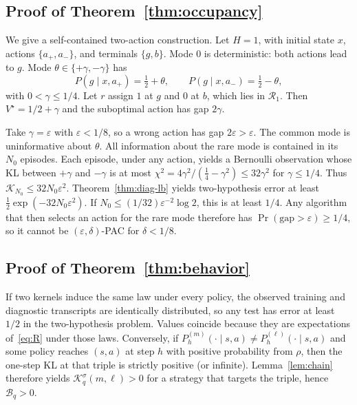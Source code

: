 \documentclass[11pt]{article}
\newcommand{\Rone}{\mathcal{R}_1}
\newcommand{\Prb}{\Pr}
\newcommand{\eps}{\varepsilon}
\begin{document}
\subsection{Proof of Theorem~\ref{thm:occupancy}}
We give a self-contained two-action construction. Let $H=1$, with initial
state $x$, actions $\{a_+,a_-\}$, and terminals $\{g,b\}$. Mode $0$ is
deterministic: both actions lead to $g$. Mode $\theta\in\{+\gamma,-\gamma\}$
has
\[
P(g\mid x,a_+)=\tfrac12+\theta,\qquad
P(g\mid x,a_-)=\tfrac12-\theta,
\]
with $0<\gamma\le 1/4$. Let $r$ assign $1$ at $g$ and $0$ at $b$, which lies
in $\Rone$. Then $V^\star=1/2+\gamma$ and the suboptimal action has gap
$2\gamma$.

Take $\gamma=\eps$ with $\eps<1/8$, so a wrong action has gap $2\eps>\eps$.
The common mode is uninformative about $\theta$. All information about the
rare mode is contained in its $N_0$ episodes. Each episode, under any
action, yields a Bernoulli observation whose KL between $+\gamma$ and
$-\gamma$ is at most $\chi^2=4\gamma^2/(\tfrac14-\gamma^2)\le 32\gamma^2$
for $\gamma\le 1/4$. Thus
$\mathcal{K}_{N_0}\le 32 N_0\eps^2$. Theorem~\ref{thm:diag-lb} yields
two-hypothesis error at least $\tfrac12\exp(-32 N_0\eps^2)$. If
$N_0\le (1/32)\eps^{-2}\log 2$, this is at least $1/4$. Any algorithm that
then selects an action for the rare mode therefore has
$\Prb(\mathrm{gap}>\eps)\ge 1/4$, so it cannot be $(\eps,\delta)$-PAC for
$\delta<1/8$.

\subsection{Proof of Theorem~\ref{thm:behavior}}
If two kernels induce the same law under every policy, the observed training
and diagnostic transcripts are identically distributed, so any test has error
at least $1/2$ in the two-hypothesis problem. Values coincide because they are
expectations of~\eqref{eq:R} under those laws. Conversely, if
$P_h^{(m)}(\cdot\mid s,a)\neq P_h^{(\ell)}(\cdot\mid s,a)$ and some policy
reaches $(s,a)$ at step $h$ with positive probability from $\rho$, then the
one-step KL at that triple is strictly positive (or infinite). Lemma~\ref{lem:chain}
therefore yields $\mathcal{K}_q^\sigma(m,\ell)>0$ for a strategy that targets
the triple, hence $\mathcal{B}_q>0$.
\end{document}
